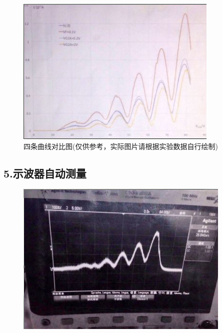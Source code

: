 \documentclass[11pt,a4paper,oneside]{article}
\begin{document}
\begin{figure}[H]
	\centering
		\includegraphics{lab2151_1.png}
    \caption{四条曲线对比图(仅供参考，实际图片请根据实验数据自行绘制)}
	\end{figure}

\subsection*{5.示波器自动测量}

\begin{figure}[H]
	\centering
		\includegraphics{lab2151_2.png}
	\end{figure}
\end{document}
